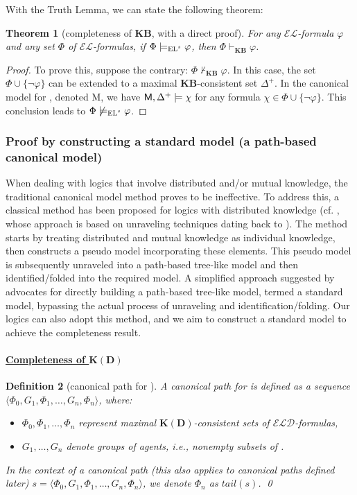 \documentclass{article}
\newtheorem{theorem}{Theorem}
\newtheorem{definition}[theorem]{Definition}%
\newcommand{\ag}{\text{\normalfont\textsf{Ag}}\xspace}
\newcommand{\CM}{\textnormal{\sf M}\xspace}
\renewcommand{\phi}{\varphi}
\newcommand{\lang}{\ensuremath{\mathcal{EL}}\xspace}
\newcommand{\langd}{\ensuremath{\mathcal{ELD}}\xspace}
\newcommand{\ld}{\text{\normalfont ELD}\xspace}
\newcommand{\ls}{\text{\normalfont EL$^s$}\xspace}
\newcommand{\KD}{\ensuremath{\mathbf{K(D)}}\xspace}
\newcommand{\KB}{\ensuremath{\mathbf{KB}}\xspace}
\begin{document}
With the Truth Lemma, we can state the following theorem:

\begin{theorem}[completeness of \KB, with a direct proof]
For any \lang-formula $\phi$ and any set $\Phi$ of \lang-formulas, if $\Phi \models_\ls \phi$, then $\Phi \vdash_\KB \phi$.
\end{theorem}
\begin{proof}
To prove this, suppose the contrary: $\Phi \not\vdash_\KB \phi$. In this case, the set $\Phi\cup\{\neg\phi\}$ can be extended to a maximal \KB-consistent set $\Delta^+$. In the canonical model for \ls, denoted \CM, we have $\CM,\Delta^+\models \chi$ for any formula $\chi\in \Phi\cup\{\neg\phi\}$. This conclusion leads to $\Phi \not\models_\ls \phi$.
\end{proof}


\subsubsection{Proof by constructing a standard model (a path-based canonical model)}
\label{sec:completeness3}

When dealing with logics that involve distributed and/or mutual knowledge, the traditional canonical model method proves to be ineffective. To address this, a classical method has been proposed for logics with distributed knowledge (cf. \cite{FHV1992}, whose approach is based on unraveling techniques dating back to \cite{Sahlqvist1975}). The method starts by treating distributed and mutual knowledge as individual knowledge, then constructs a pseudo model incorporating these elements. This pseudo model is subsequently unraveled into a path-based tree-like model and then identified/folded into the required model. A simplified approach suggested by \cite{WA2020} advocates for directly building a path-based tree-like model, termed a standard model, bypassing the actual process of unraveling and identification/folding. Our logics can also adopt this method, and we aim to construct a standard model to achieve the completeness result.

\paragraph{\underline{Completeness of \KD}}

\begin{definition}[canonical path for \ld]
A \emph{canonical path} for \ld is defined as a sequence $\langle \Phi_0, G_1, \Phi_1, \dots, G_n, \Phi_n \rangle$, where:
\begin{itemize}
\item $\Phi_0, \Phi_1, \dots, \Phi_n$ represent maximal \KD-consistent sets of \langd-formulas,
\item $G_1, \dots, G_n$ denote groups of agents, i.e., nonempty subsets of \ag.
\end{itemize}
In the context of a canonical path (this also applies to canonical paths defined later) $s = \langle \Phi_0,G_1,\Phi_1,\dots,G_n,\Phi_n \rangle$, we denote $\Phi_n$ as $tail(s)$.
\qed
\end{definition}
\end{document}
